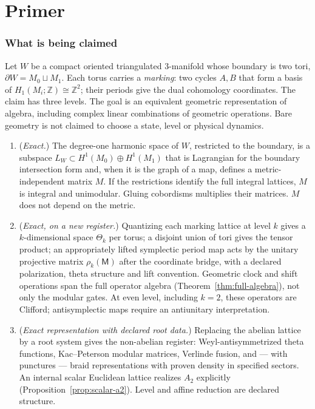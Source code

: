 \documentclass[11pt]{article}
\theoremstyle{definition}
\theoremstyle{remark}
\newcommand{\Z}{\mathbb{Z}}
\begin{document}
\part{Primer}

\section{What is being claimed}

Let $W$ be a compact oriented triangulated $3$-manifold whose boundary is two tori,
$\partial W = M_0 \sqcup M_1$. Each torus carries a \emph{marking}: two
cycles $A, B$ that form a basis of $H_1(M_i;\Z) \cong \Z^2$; their periods
give the dual cohomology coordinates. The claim has
three levels. The goal is an equivalent geometric representation
of algebra, including complex linear combinations of geometric operations.
Bare geometry is not claimed to choose a state, level or physical dynamics.

\begin{enumerate}[nosep]
  \item (\emph{Exact.}) The degree-one harmonic space of $W$, restricted to
    the boundary, is a subspace $L_W \subset H^1(M_0)\oplus H^1(M_1)$ that is
    Lagrangian for the boundary intersection form and, when it is the graph
    of a map, defines a metric-independent matrix $M$. If the restrictions
    identify the full integral lattices, $M$ is integral and unimodular.
    Gluing cobordisms multiplies their matrices. $M$ does not depend on the
    metric.
  \item (\emph{Exact, on a new register.}) Quantizing each marking lattice at
    level $k$ gives a $k$-dimensional space $\Theta_k$ per torus; a disjoint
    union of tori gives the tensor product; an appropriately lifted symplectic
    period map acts by the unitary projective matrix $\rho_k(\mathsf M)$
    after the coordinate bridge, with a declared
    polarization, theta structure and lift convention. Geometric clock and
    shift operations span the full operator algebra
    (Theorem~\ref{thm:full-algebra}), not only the modular gates. At even level,
    including $k=2$, these operators are Clifford; antisymplectic maps
    require an antiunitary interpretation.
  \item (\emph{Exact representation with declared root data.}) Replacing
    the abelian lattice by a root system
    gives the non-abelian register: Weyl-antisymmetrized theta functions,
    Kac--Peterson modular matrices, Verlinde fusion, and --- with punctures
    --- braid representations with proven density in specified sectors.
    An internal scalar Euclidean lattice realizes $A_2$ explicitly
    (Proposition~\ref{prop:scalar-a2}). Level and affine reduction are
    declared structure.
\end{enumerate}
\end{document}
